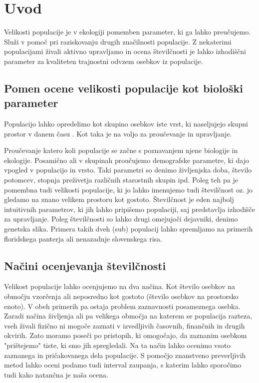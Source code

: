 \section{Uvod}
Velikosti populacije je v ekologiji pomemben parameter, ki ga lahko preučujemo. Služi v pomoč pri raziskovanju drugih značilnosti populacije. Z nekaterimi populacijami živali aktivno upravljamo in ocena številčnosti je lahko izhodiščni parameter za kvaliteten trajnostni odvzem osebkov iz populacije.

\subsection{Pomen ocene velikosti populacije kot biološki parameter}
Populacijo lahko opredelimo kot skupino osebkov iste vrst, ki naseljujejo skupni prostor v danem času \citep{krebs_ecology:_2001}. Kot taka je na voljo za proučevanje in upravljanje.

Proučevanje katero koli populacije se začne s poznavanjem njene biologije in ekologije. Posamično ali v skupinah proučujemo demografske parametre, ki dajo vpogled v populacijo in vrsto. Taki parametri so denimo življenjska doba, število potomcev, stopnja preživetja različnih starostnih skupin ipd. Poleg teh pa je pomembna tudi velikosti populacije, ki jo lahko imenujemo tudi številčnost oz. jo gledamo na znano velikem prostoru kot gostoto. Številčnost je eden najbolj intuitivnih parametrov, ki jih lahko pripišemo populaciji, saj predstavlja izhodišče za upravljanje. Poleg številčnosti so lahko drugi omejujoči dejavniki, denimo genetska slika. Primera takih dveh (sub) populacij lahko spremljamo na primerih floridskega panterja \citep{pimm_genetic_2006} ali nenazadnje slovenskega risa.

\subsection{Načini ocenjevanja številčnosti}
Velikost populacije lahko ocenjujemo na dva načina. Kot število osebkov na območju vzorčenja ali neposredno kot gostoto (število osebkov na prostorsko enoto). V obeh primerih pa ostaja problem zaznavnosti posameznega osebka. Zaradi načina življenja ali pa velikega območja na katerem se populacija razteza, vseh živali fizično ni mogoče zaznati v izvedljivih časovnih, finančnih in drugih okvirih. Zato moramo poseči po pristopih, ki omogočajo, da zaznanim osebkom "prištejemo" tiste, ki smo jih spregledali. Na ta način lahko ocenimo vsoto zaznanega in pričakovanega dela populacije. S pomočjo znanstveno preverljivih metod lahko oceni podamo tudi interval zaupanja, s katerim lahko sporočimo tudi kako natančna je naša ocena.


